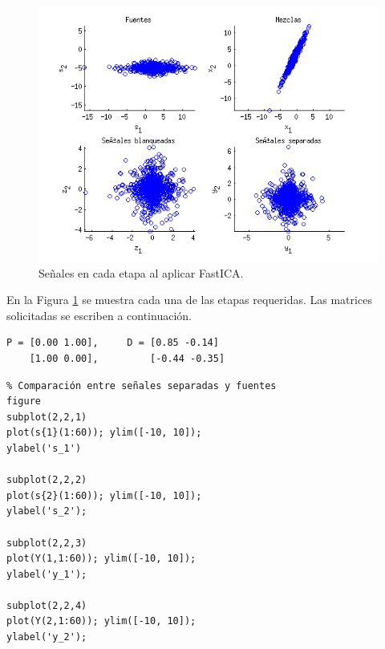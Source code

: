 \documentclass[11pt,a4paper,final]{article}
\begin{document}
\begin{figure}
\includegraphics [width=\textwidth]{Ejercicio4_01.png}
\caption{Señales en cada etapa al aplicar FastICA.}
\label{fig:ejercicio41}
\end{figure}

En la Figura \ref{fig:ejercicio41} se muestra cada una de las etapas requeridas. Las matrices solicitadas se escriben a continuación.

\begin{verbatim}P = [0.00 1.00],	 D = [0.85 -0.14]
    [1.00 0.00],	     [-0.44 -0.35]
\end{verbatim}

\begin{verbatim}
% Comparación entre señales separadas y fuentes
figure
subplot(2,2,1)
plot(s{1}(1:60)); ylim([-10, 10]);
ylabel('s_1')

subplot(2,2,2)
plot(s{2}(1:60)); ylim([-10, 10]);
ylabel('s_2');

subplot(2,2,3)
plot(Y(1,1:60)); ylim([-10, 10]);
ylabel('y_1');

subplot(2,2,4)
plot(Y(2,1:60)); ylim([-10, 10]);
ylabel('y_2');
\end{verbatim}
\end{document}
